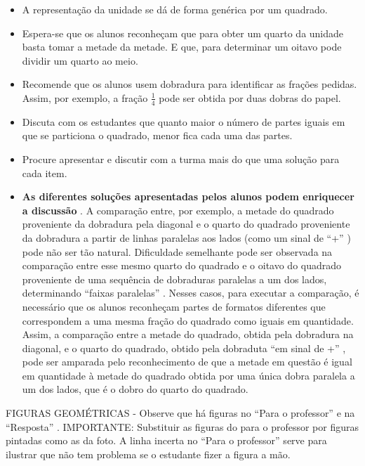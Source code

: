 \documentclass[a4paper,12pt,twoside]{book}
\begin{document}
\begin{professor*}[breakable]{}{}
\begin{itemize} %
    \item       A representação da unidade se dá de forma genérica por um quadrado. 
    \item       Espera-se que os alunos reconheçam que para obter um quarto da unidade basta tomar a metade da metade. E que, para determinar um oitavo pode dividir um quarto ao meio.
    \item       Recomende que os alunos usem dobradura para identificar as frações pedidas. Assim, por exemplo, a fração       $\frac{1}{4}$       pode ser obtida por duas dobras do papel.    
    \item       Discuta com os estudantes que quanto maior o número de partes iguais em que se particiona o quadrado, menor fica cada uma das partes.
    \item       Procure apresentar e discutir com a turma mais do que uma solução para cada item.
    \item             {\bf As diferentes soluções apresentadas pelos alunos podem enriquecer a discussão}      . A comparação entre, por exemplo, a metade do quadrado proveniente da dobradura pela diagonal e o quarto do quadrado proveniente da dobradura a partir de linhas paralelas aos lados (como um sinal de       ``+''      ) pode não ser tão natural. Dificuldade semelhante pode ser observada na comparação entre esse mesmo quarto do quadrado e o oitavo do quadrado proveniente de uma sequência de dobraduras paralelas a um dos lados, determinando       ``faixas paralelas''      . Nesses casos, para executar a comparação, é necessário que os alunos reconheçam partes de formatos diferentes que correspondem a uma mesma fração do quadrado como iguais em quantidade. Assim, a comparação entre a metade do quadrado, obtida pela dobradura na diagonal, e o quarto do quadrado, obtido pela dobraduta       ``em sinal de +''      , pode ser amparada pelo reconhecimento de que a metade em questão é igual em quantidade à metade do quadrado obtida por uma única dobra paralela a um dos lados, que é o dobro do quarto do quadrado.  
\end{itemize} %
  
  
  
  
\end{professor*}

\begin{imagem*}[breakable]{}{}   FIGURAS GEOMÉTRICAS - Observe que há figuras no   ``Para o professor''   e na   ``Resposta''  . IMPORTANTE: Substituir as figuras do para o professor por figuras pintadas como as da foto. A linha incerta no   ``Para o professor''   serve para ilustrar que não tem problema se o estudante fizer a figura a mão.  
\end{imagem*}
\end{document}
